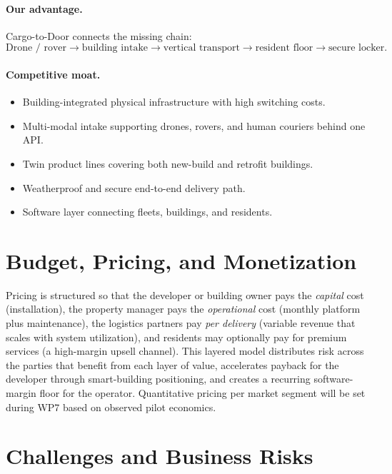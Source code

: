 \documentclass[11pt,a4paper]{report}
\begin{document}
\paragraph{Our advantage.}
Cargo-to-Door connects the missing chain:
\[
\text{Drone / rover} \rightarrow \text{building intake} \rightarrow
\text{vertical transport} \rightarrow \text{resident floor} \rightarrow
\text{secure locker}.
\]

\paragraph{Competitive moat.}
\begin{itemize}
    \item Building-integrated physical infrastructure with high
    switching costs.
    \item Multi-modal intake supporting drones, rovers, and human
    couriers behind one API.
    \item Twin product lines covering both new-build and retrofit
    buildings.
    \item Weatherproof and secure end-to-end delivery path.
    \item Software layer connecting fleets, buildings, and residents.
\end{itemize}

\section{Budget, Pricing, and Monetization}
\label{sec:budget}

Pricing is structured so that the developer or building owner pays the
\emph{capital} cost (installation), the property manager pays the
\emph{operational} cost (monthly platform plus maintenance), the
logistics partners pay \emph{per delivery} (variable revenue that
scales with system utilization), and residents may optionally pay for
premium services (a high-margin upsell channel). This layered model
distributes risk across the parties that benefit from each layer of
value, accelerates payback for the developer through smart-building
positioning, and creates a recurring software-margin floor for the
operator. Quantitative pricing per market segment will be set during
WP7 based on observed pilot economics.

\section{Challenges and Business Risks}
\label{sec:risks}
\end{document}
